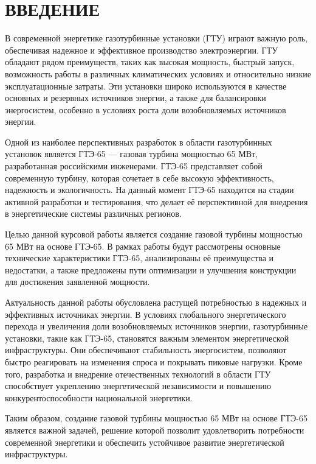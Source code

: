 \section*{ВВЕДЕНИЕ}

В современной энергетике газотурбинные установки (ГТУ) играют важную роль, обеспечивая надежное и эффективное производство электроэнергии. ГТУ обладают рядом преимуществ, таких как высокая мощность, быстрый запуск, возможность работы в различных климатических условиях и относительно низкие эксплуатационные затраты. Эти установки широко используются в качестве основных и резервных источников энергии, а также для балансировки энергосистем, особенно в условиях роста доли возобновляемых источников энергии.

Одной из наиболее перспективных разработок в области газотурбинных установок является ГТЭ-65 — газовая турбина мощностью 65 МВт, разработанная российскими инженерами. ГТЭ-65 представляет собой современную турбину, которая сочетает в себе высокую эффективность, надежность и экологичность. На данный момент ГТЭ-65 находится на стадии активной разработки и тестирования, что делает её перспективной для внедрения в энергетические системы различных регионов.

Целью данной курсовой работы является создание газовой турбины мощностью 65 МВт на основе ГТЭ-65. В рамках работы будут рассмотрены основные технические характеристики ГТЭ-65, анализированы её преимущества и недостатки, а также предложены пути оптимизации и улучшения конструкции для достижения заявленной мощности.

Актуальность данной работы обусловлена растущей потребностью в надежных и эффективных источниках энергии. В условиях глобального энергетического перехода и увеличения доли возобновляемых источников энергии, газотурбинные установки, такие как ГТЭ-65, становятся важным элементом энергетической инфраструктуры. Они обеспечивают стабильность энергосистем, позволяют быстро реагировать на изменения спроса и покрывать пиковые нагрузки. Кроме того, разработка и внедрение отечественных технологий в области ГТУ способствует укреплению энергетической независимости и повышению конкурентоспособности национальной энергетики.

Таким образом, создание газовой турбины мощностью 65 МВт на основе ГТЭ-65 является важной задачей, решение которой позволит удовлетворить потребности современной энергетики и обеспечить устойчивое развитие энергетической инфраструктуры.

